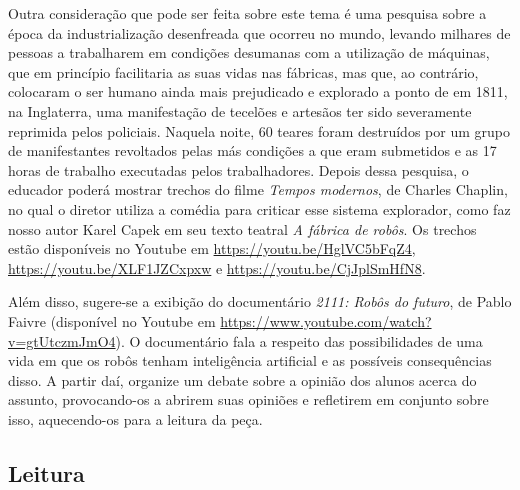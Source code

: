 \documentclass[11pt]{extarticle}
\begin{document}
Outra consideração que pode ser feita sobre este tema é uma pesquisa sobre a época da industrialização desenfreada que ocorreu no mundo, levando milhares de pessoas a trabalharem em condições desumanas com a utilização de máquinas, que em princípio facilitaria as suas vidas nas fábricas, mas que, ao contrário, colocaram o ser humano ainda mais prejudicado e explorado a ponto de em 1811, na Inglaterra, uma manifestação de tecelões e artesãos ter sido severamente reprimida pelos policiais. Naquela noite, 60 teares foram destruídos por um grupo de manifestantes revoltados pelas más condições a que eram submetidos e as 17 horas de trabalho executadas pelos trabalhadores. Depois dessa pesquisa, o educador poderá mostrar trechos do filme \textit{Tempos modernos}, de Charles Chaplin, no qual o diretor utiliza a comédia para criticar esse sistema explorador, como faz nosso autor Karel Capek em seu texto teatral \textit{A fábrica de robôs}. Os trechos estão disponíveis no Youtube em \url{https://youtu.be/HglVC5bFqZ4}, \url{https://youtu.be/XLF1JZCxpxw} e \url{https://youtu.be/CjJplSmHfN8}. 


Além disso, sugere-se a exibição do documentário \textit{2111: Robôs do futuro}, de Pablo Faivre (disponível no Youtube em \url{https://www.youtube.com/watch?v=gtUtczmJmO4}). O documentário fala a respeito das possibilidades de uma vida em que os robôs tenham inteligência artificial e as possíveis consequências disso. A partir daí, organize um debate sobre a opinião dos alunos acerca do assunto, provocando-os a abrirem suas opiniões e refletirem em conjunto sobre isso, aquecendo-os para a leitura da peça.

\subsection{Leitura}
\end{document}
